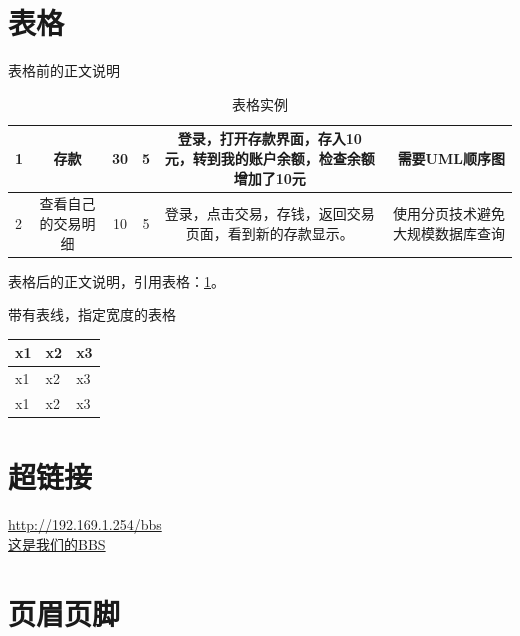\documentclass[a4paper,12pt]{article} %
\begin{document}
\section{表格}
表格前的正文说明
\begin{table}[!th]
\begin{tabular}{|l|c|c|c|c|r|}
\toprule
1	&存款	&30	&5	&登录，打开存款界面，存入10元，转到我的账户余额，检查余额增加了10元	&需要UML顺序图	\\
\midrule
2	&查看自己的交易明细 &10 &5 &登录，点击交易，存钱，返回交易页面，看到新的存款显示。 &使用分页技术避免大规模数据库查询 \\
\bottomrule
\end{tabular}
\caption{表格实例}
\label{ex:table}
\end{table}
表格后的正文说明，引用表格：\ref{ex:table}。

{带有表线，指定宽度的表格}
\begin{table}[htbp]
  \centering
  \begin{tabular}{|p{80pt}|>{\centering}p{80pt}|>{\raggedleft\arraybackslash}p{80pt}|}
    \toprule
    x1  & x2  & x3\\
    \midrule
    x1  & x2  & x3\\
    x1  & x2  & x3\\
    \bottomrule
  \end{tabular}
\end{table}


\section{超链接}
\url{http://192.169.1.254/bbs}\\
\href{http://192.169.1.254/bbs}{这是我们的BBS}


\section{页眉页脚}
\end{document}
